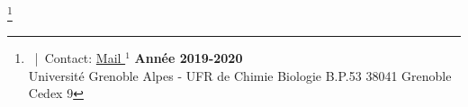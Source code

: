 \documentclass[../Master_report2.tex]{subfiles}
\begin{document}
\begin{titlepage}
\noindent
\begin{minipage}{1.8in}

\end{minipage}
\hfill
\begin{minipage}{3.55in}
\makeatletter
\@labadr
\makeatother
\end{minipage}

\begin{figure}[h]
\begin{center}
\makeatletter
\@pict
\makeatother
\end{center}
\end{figure}
\thispagestyle{empty}


\renewcommand{\footnoterule}{%
  \kern -3pt
  \hrule width \textwidth height 1pt
  \kern 2pt
}


\let\thefootnote\relax\makeatletter\footnote{{%
\@credpict
~|~Contact:  \href{mailto:\@email%
}{Mail $^1$}} 
\hfill \textbf{Année 2019-2020}\\
Université Grenoble Alpes - UFR de Chimie Biologie B.P.53 38041 Grenoble Cedex 9}
\makeatother


\end{titlepage}
\end{document}

